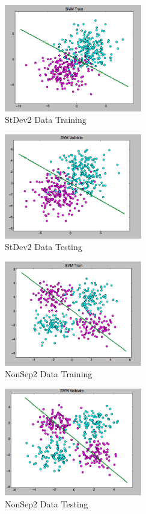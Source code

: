 \documentclass[pageno]{jpaper}
\begin{document}
\begin{figure}[ht!]
\centering
\includegraphics[width=60mm]{stdev2_train}
\caption{StDev2 Data Training}
\label{overflow}
\end{figure}

\begin{figure}[ht!]
\centering
\includegraphics[width=60mm]{stdev2_test}
\caption{StDev2 Data Testing}
\label{overflow}
\end{figure}

\begin{figure}[ht!]
\centering
\includegraphics[width=60mm]{nonSep2_train}
\caption{NonSep2 Data Training}
\label{overflow}
\end{figure}

\begin{figure}[ht!]
\centering
\includegraphics[width=60mm]{nonSep2_test}
\caption{NonSep2 Data Testing}
\label{overflow}
\end{figure}
\end{document}
